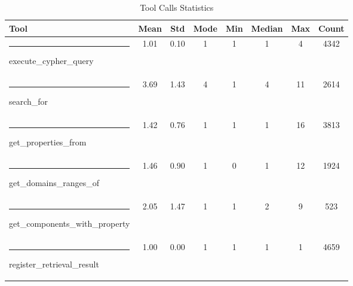 \begin{table}
    \begin{tabular}{lccccccc}
        \hline
        \textbf{Tool} & \textbf{Mean} & \textbf{Std} & \textbf{Mode} & \textbf{Min} & \textbf{Median} & \textbf{Max} & \textbf{Count} \\
        \hline
        \textcolor{execute\_cypher\_query}{\rule{8pt}{4pt}} execute\_cypher\_query                      & 1.01 & 0.10 & 1 & 1 & 1 & 4  & 4342 \\
        \textcolor{search\_for}{\rule{8pt}{4pt}} search\_for                                            & 3.69 & 1.43 & 4 & 1 & 4 & 11 & 2614 \\
        \textcolor{get\_properties\_from}{\rule{8pt}{4pt}} get\_properties\_from                        & 1.42 & 0.76 & 1 & 1 & 1 & 16 & 3813 \\
        \textcolor{get\_domains\_ranges\_of}{\rule{8pt}{4pt}} get\_domains\_ranges\_of                  & 1.46 & 0.90 & 1 & 0 & 1 & 12 & 1924 \\
        \textcolor{get\_components\_with\_property}{\rule{8pt}{4pt}} get\_components\_with\_property    & 2.05 & 1.47 & 1 & 1 & 2 & 9  & 523  \\
        \textcolor{register\_retrieval\_result}{\rule{8pt}{4pt}} register\_retrieval\_result            & 1.00 & 0.00 & 1 & 1 & 1 & 1  & 4659 \\
        \hline
    \end{tabular}
    \caption{Tool Calls Statistics}
    \label{tab:tool-calls-statistics}
\end{table}